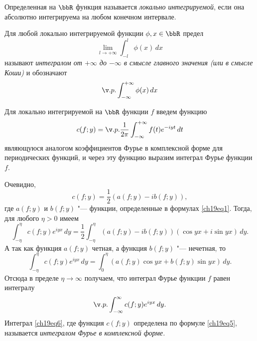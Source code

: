 \begin{defn}
Определенная на $\bbR$ функция называется \textit{локально интегрируемой}, если она абсолютно интегрируема на любом конечном интервале.
\end{defn}
\begin{defn}
Для любой локально интегрируемой функции $\phi, x \in \bbR$ предел
$$
\lim_{l \to +\infty}\int_{-l}^{l} \phi(x)\,dx
$$
называют \textit{интегралом от $+\infty$ до $-\infty$ в смысле главного значения (или в смысле Коши)} и обозначают
$$
\v.p.\int_{-\infty}^{+\infty} \phi(x)\,dx
$$
\end{defn}

Для локально интегрируемой на $\bbR$ функции $f$ введем функцию
\begin{equation} \label{ch19eq5}
c(f;y)=\v.p.\frac{1}{2\pi}\int_{-\infty}^{+\infty} f(t)e^{-iyt}\,dt
\end{equation}
являющуюся аналогом коэффициентов Фурье в комплексной форме для периодических функций, и через эту функцию выразим интеграл Фурье функции $f$.

Очевидно,
$$
c(f;y) = \frac12 (a(f;y) - ib(f;y)),
$$
где $a(f;y)$ и $b(f;y)$ "--- функции, определенные в формулах \eqref{ch19eq1}. Тогда, для любого $\eta > 0$ имеем
$$
\int_{-\eta}^{\eta} c(f;y)e^{iyx}\,dy = \frac12 \int_{-\eta}^{\eta} (a(f;y) - ib(f;y))(\cos yx + i\sin yx)\,dy.
$$
А так как функция $a(f;y)$ четная, а функция $b(f;y)$ "--- нечетная, то
$$
\int_{-\eta}^{\eta} c(f;y)e^{iyx}\,dy = \int_{0}^{\eta}(a(f;y)\cos yx + b(f;y)\sin yx)\,dy.
$$
Отсюда в пределе $\eta \to \infty$ получаем, что интеграл Фурье функции $f$ равен интегралу
\begin{equation} \label{ch19eq6}
\v.p. \int_{-\infty}^{\infty} c(f;y)e^{iyx}\,dy.
\end{equation}
Интеграл \eqref{ch19eq6}, где функция $c(f;y)$ определена по формуле \eqref{ch19eq5}, называется \textit{интегралом Фурье в комплексной форме.}


